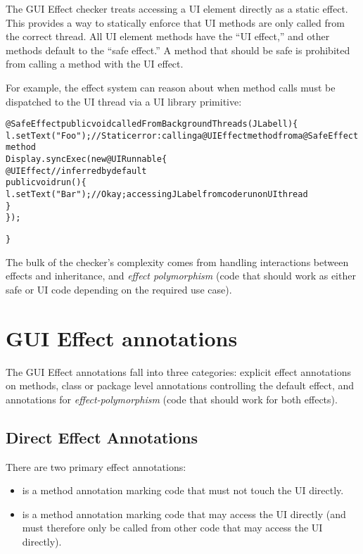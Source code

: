 The GUI Effect checker treats accessing a UI element directly as a static effect.  
This provides a way to statically enforce that UI methods are only
called from the correct thread.  All UI element methods have the ``UI effect,'' and other methods
default to the ``safe effect.''  A method that should be safe is prohibited from calling a method
with the UI effect. 

For example, the effect system can reason about when method calls must be dispatched to the UI
thread via a UI library primitive:
\begin{alltt}
@SafeEffect public void calledFromBackgroundThreads(JLabel l) \{
    l.setText("Foo"); // Static error: calling a @UIEffect method from a @SafeEffect method
    Display.syncExec(new @UI Runnable \{
        @UIEffect // inferred by default
        public void run() \{
            l.setText("Bar"); // Okay; accessing JLabel from code run on UI thread
        \}
    \});

\}
\end{alltt}

The bulk of the checker's complexity comes from handling interactions between effects and
inheritance, and \emph{effect polymorphism} (code that should work as either safe or UI code
depending on the required use case).

\section{GUI Effect annotations\label{guieffects-annotations}}
The GUI Effect annotations fall into three categories: explicit effect annotations on methods, class
or package level annotations controlling the default effect, and annotations for
\emph{effect-polymorphism} (code that should work for both effects).

\subsection{Direct Effect Annotations}
There are two primary effect annotations:
\begin{itemize}
\item {} is a method annotation marking code that must not touch the UI directly.
\item {} is a method annotation marking code that may access the UI directly (and must
therefore only be called from other code that may access the UI directly).
\end{itemize}

